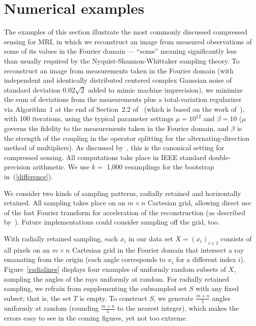 \documentclass{article}
\begin{document}
\section{Numerical examples}
\label{numex}

The examples of this section illustrate
the most commonly discussed compressed sensing for MRI,
in which we reconstruct an image from measured observations of some
of its values in the Fourier domain --- ``some'' meaning significantly less
than usually required by the Nyquist-Shannon-Whittaker sampling theory.
To reconstruct an image from measurements taken in the Fourier domain
(with independent and identically distributed centered complex Gaussian noise
of standard deviation $0.02\sqrt{2}$ added to mimic machine imprecision),
we minimize the sum of deviations from the measurements
plus a total-variation regularizer
via Algorithm~1 at the end of Section~2.2 of~\cite{tao-yang}
(which is based on the work of~\cite{yang-zhang}), with 100 iterations,
using the typical parameter settings $\mu = 10^{12}$ and $\beta = 10$
($\mu$ governs the fidelity to the measurements taken in the Fourier domain,
and $\beta$ is the strength of the coupling in the operator splitting
for the alternating-direction method of multipliers).
As discussed by~\cite{tropp}, this is the canonical setting
for compressed sensing.
All computations take place in IEEE standard double-precision arithmetic.
We use $k =$ 1,000 resamplings for the bootstrap in~(\ref{difference}).

We consider two kinds of sampling patterns,
radially retained and horizontally retained.
All sampling takes place on an $m \times n$ Cartesian grid,
allowing direct use of the fast Fourier transform
for acceleration of the reconstruction (as described by~\cite{tao-yang}).
Future implementations could consider sampling off the grid, too.

With radially retained sampling,
each $x_i$ in our data set $X = (x_i)_{i \in I}$
consists of all pixels on an $m \times n$ Cartesian grid in the Fourier domain
that intersect a ray emanating from the origin (each angle corresponds
to $x_i$ for a different index $i$). Figure~\ref{radialines} displays
four examples of uniformly random subsets of $X$, sampling the angles
of the rays uniformly at random.
For radially retained sampling, we refrain from supplementing
the subsampled set $S$ with any fixed subset; that is, the set $T$ is empty.
To construct $S$, we generate $\frac{m + n}{5}$ angles uniformly at random
(rounding $\frac{m + n}{5}$ to the nearest integer), which makes the errors
easy to see in the coming figures, yet not too extreme.
\end{document}
